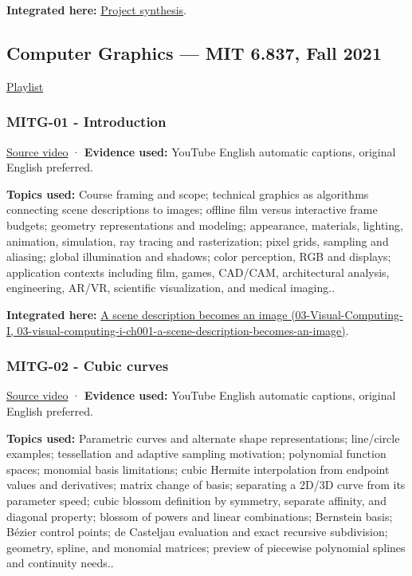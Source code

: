 \textbf{Integrated here:} \hyperref[04-visual-computing-ii-ch034-photographic-workflow-and-integrated-decisions]{Project synthesis}.

\subsection{Computer Graphics --- MIT 6.837, Fall 2021}\label{04-visual-computing-ii-ch036-computer-graphics-mit-6.837-fall-2021}

\href{https://www.youtube.com/playlist?list=PLQ3UicqQtfNtqt2yL3KgKV-yn0NEPbRVi}{Playlist}

\subsubsection{MITG-01 - Introduction}\label{04-visual-computing-ii-ch036-mitg-01---introduction}

\href{https://www.youtube.com/watch?v=tPzC879i-ag}{Source video} · \textbf{Evidence used:} YouTube English automatic captions, original English preferred.

\textbf{Topics used:} Course framing and scope; technical graphics as algorithms connecting scene descriptions to images; offline film versus interactive frame budgets; geometry representations and modeling; appearance, materials, lighting, animation, simulation, ray tracing and rasterization; pixel grids, sampling and aliasing; global illumination and shadows; color perception, RGB and displays; application contexts including film, games, CAD/CAM, architectural analysis, engineering, AR/VR, scientific visualization, and medical imaging..

\textbf{Integrated here:} \href{../03-Visual-Computing-I/main.pdf\#nameddest=03-visual-computing-i-ch001-a-scene-description-becomes-an-image}{A scene description becomes an image (03-Visual-Computing-I, 03-visual-computing-i-ch001-a-scene-description-becomes-an-image)}.

\subsubsection{MITG-02 - Cubic curves}\label{04-visual-computing-ii-ch036-mitg-02---cubic-curves}

\href{https://www.youtube.com/watch?v=1BZ0ayVjWEk}{Source video} · \textbf{Evidence used:} YouTube English automatic captions, original English preferred.

\textbf{Topics used:} Parametric curves and alternate shape representations; line/circle examples; tessellation and adaptive sampling motivation; polynomial function spaces; monomial basis limitations; cubic Hermite interpolation from endpoint values and derivatives; matrix change of basis; separating a 2D/3D curve from its parameter speed; cubic blossom definition by symmetry, separate affinity, and diagonal property; blossom of powers and linear combinations; Bernstein basis; Bézier control points; de Casteljau evaluation and exact recursive subdivision; geometry, spline, and monomial matrices; preview of piecewise polynomial splines and continuity needs..

